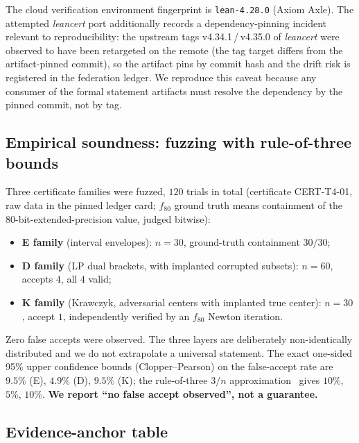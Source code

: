 \documentclass[11pt]{article}
\theoremstyle{definition}
\theoremstyle{remark}
\begin{document}
The cloud verification environment fingerprint is \texttt{lean-4.28.0}
(Axiom Axle). The attempted \emph{leancert} port additionally records a
dependency-pinning incident relevant to reproducibility: the upstream tags
v4.34.1\,/\,v4.35.0 of \emph{leancert} were observed to have been retargeted
on the remote (the tag target differs from the artifact-pinned commit), so
the artifact pins by commit hash and the drift risk is registered in the
federation ledger. We reproduce this caveat because any consumer of the
formal statement artifacts must resolve the dependency by the pinned commit,
not by tag.

\subsection{Empirical soundness: fuzzing with rule-of-three bounds}

Three certificate families were fuzzed, $120$ trials in total
(certificate CERT-T4-01, raw data in the pinned ledger card; $f_{80}$ ground truth means containment of the
80-bit-extended-precision value, judged bitwise):
\begin{itemize}
\item \textbf{E family} (interval envelopes): $n=30$, ground-truth
containment $30/30$;
\item \textbf{D family} (LP dual brackets, with implanted corrupted
subsets): $n=60$, accepts $4$, all $4$ valid;
\item \textbf{K family} (Krawczyk, adversarial centers with implanted true
center): $n=30$, accept $1$, independently verified by an $f_{80}$ Newton
iteration.
\end{itemize}
Zero false accepts were observed. The three layers are deliberately
non-identically distributed and we do not extrapolate a universal statement.
The exact one-sided 95\% upper confidence bounds (Clopper--Pearson) on the
false-accept rate are $9.5\%$ (E), $4.9\%$ (D), $9.5\%$ (K); the
rule-of-three $3/n$ approximation~\cite{hanley1983} gives $10\%$, $5\%$,
$10\%$.
\textbf{We report ``no false accept observed'', not a guarantee.}

\subsection{Evidence-anchor table}
\end{document}
